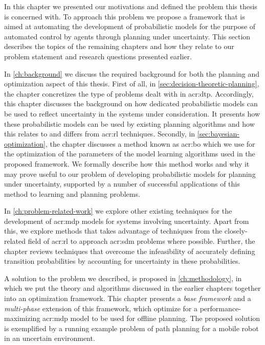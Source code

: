 In this chapter we presented our motivations and defined the problem this thesis is concerned with.
To approach this problem we propose a framework that is aimed at automating the development of probabilistic models for the purpose of automated control by agents through planning under uncertainty.
This section describes the topics of the remaining chapters and how they relate to our problem statement and research questions presented earlier.

In \autoref{ch:background} we discuss the required background for both the planning and optimization aspect of this thesis.
First of all, in \autoref{sec:decision-theoretic-planning}, the chapter concretizes the type of problems dealt with in \acrshort{acr:dtp}. 
Accordingly, this chapter discusses the background on how dedicated probabilistic models can be used to reflect uncertainty in the systems under consideration.
It presents how these probabilistic models can be used by existing planning algorithms and how this relates to and differs from \acrshort{acr:rl} techniques.
Secondly, in \autoref{sec:bayesian-optimization}, the chapter discusses a method known as \acrlong{acr:bo} which we use for the optimization of the parameters of the model learning algorithms used in the proposed framework.
We formally describe how this method works and why it may prove useful to our problem of developing probabilistic models for planning under uncertainty, supported by a number of successful applications of this method to learning and planning problems.

In \autoref{ch:problem-related-work} we explore other existing techniques for the development of \acrshort{acr:mdp} models for systems involving uncertainty.
Apart from this, we explore methods that takes advantage of techniques from the closely-related field of \acrshort{acr:rl} to approach \acrshort{acr:sdm} problems where possible.
Further, the chapter reviews techniques that overcome the infeasibility of accurately defining transition probabilities by accounting for uncertainty in these probabilities.

A solution to the problem we described, is proposed in \autoref{ch:methodology}, in which we put the theory and algorithms discussed in the earlier chapters together into an optimization framework.
This chapter presents a \textit{base framework} and a \textit{multi-phase} extension of this framework, which optimize for a performance-maximizing \acrshort{acr:mdp} model to be used for offline planning.
The proposed solution is exemplified by a running example problem of path planning for a mobile robot in an uncertain environment.

